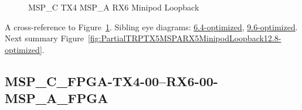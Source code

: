 \begin{figure}[h]
\begin{subfigure}{0.33\textwidth}
\hyperref[sec:MSPCFPGATX406RX606MSPAFPGA12.8-optimized]{}
\end{subfigure}\hspace*{\fill}
\begin{subfigure}{0.33\textwidth}
\hyperref[sec:MSPCFPGATX407RX607MSPAFPGA12.8-optimized]{}
\end{subfigure}\hspace*{\fill}
\begin{subfigure}{0.33\textwidth}
\hyperref[sec:MSPCFPGATX408RX608MSPAFPGA12.8-optimized]{}
\end{subfigure}

\begin{subfigure}{0.33\textwidth}
\hyperref[sec:MSPCFPGATX409RX609MSPAFPGA12.8-optimized]{}
\end{subfigure}\hspace*{\fill}
\begin{subfigure}{0.33\textwidth}
\hyperref[sec:MSPCFPGATX410RX610MSPAFPGA12.8-optimized]{}
\end{subfigure}\hspace*{\fill}
\begin{subfigure}{0.33\textwidth}
\hyperref[sec:MSPCFPGATX411RX611MSPAFPGA12.8-optimized]{}
\end{subfigure}

\caption{MSP\_C TX4 MSP\_A RX6 Minipod Loopback} \label{fig:MSPCTX4MSPARX6MinipodLoopback12.8-optimized}
\end{figure}

A cross-reference to Figure~\ref{fig:MSPCTX4MSPARX6MinipodLoopback12.8-optimized}.
Sibling eye diagrams: \hyperref[sec:MSPCTX4MSPARX6MinipodLoopback6.4-optimized]{6.4-optimized}, \hyperref[sec:MSPCTX4MSPARX6MinipodLoopback9.6-optimized]{9.6-optimized}. \\
Next summary Figure~\ref{fig:PartialTRPTX5MSPARX5MinipodLoopback12.8-optimized}.
\clearpage
% 
\subsection{MSP\_C\_FPGA-TX4-00--RX6-00-MSP\_A\_FPGA}\label{sec:MSPCFPGATX400RX600MSPAFPGA12.8-optimized}

